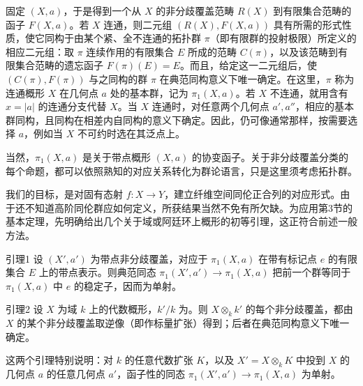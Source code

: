 固定 $(X,a)$，于是得到一个从 $X$ 的非分歧覆盖范畴 $R(X)$ 到有限集合范畴的函子 $F(X,a)$。若 $X$ 连通，则二元组 $(R(X),F(X,a))$ 具有所需的形式性质，使它同构于由某个紧、全不连通的拓扑群 $\pi$（即有限群的投射极限）所定义的相应二元组：取 $\pi$ 连续作用的有限集合 $E$ 所成的范畴 $C(\pi)$，以及该范畴到有限集合范畴的遗忘函子 $F(\pi)(E)=E$。而且，给定这一二元组后，使 $(C(\pi),F(\pi))$ 与之同构的群 $\pi$ 在典范同构意义下唯一确定。在这里，$\pi$ 称为连通概形 $X$ 在几何点 $a$ 处的基本群，记为 $\pi_1(X,a)$。若 $X$ 不连通，就用含有 $x=|a|$ 的连通分支代替 $X$。当 $X$ 连通时，对任意两个几何点 $a',a''$，相应的基本群同构，且同构在相差内自同构的意义下确定。因此，仍可像通常那样，按需要选择 $a$，例如当 $X$ 不可约时选在其泛点上。

当然，$\pi_1(X,a)$ 是关于带点概形 $(X,a)$ 的协变函子。关于非分歧覆盖分类的每个命题，都可以依照熟知的对应关系转化为群论语言，只是这里须考虑拓扑群。

我们的目标，是对固有态射 $f:X\to Y$，建立纤维空间同伦正合列的对应形式。由于还不知道高阶同伦群应如何定义，所获结果当然不免有所欠缺。为应用第3节的基本定理，先明确给出几个关于域或阿廷环上概形的初等引理，这正符合前述一般方法。
\begin{statement}{引理1}
设 $(X',a')$ 为带点非分歧覆盖，对应于 $\pi_1(X,a)$ 在带有标记点 $e$ 的有限集合 $E$ 上的带点表示。则典范同态 $\pi_1(X',a')\to\pi_1(X,a)$ 把前一个群等同于 $\pi_1(X,a)$ 中 $e$ 的稳定子，因而为单射。
\end{statement}
\begin{statement}{引理2}
设 $X$ 为域 $k$ 上的代数概形，$k'/k$ 为。则 $X\otimes_kk'$ 的每个非分歧覆盖，都由 $X$ 的某个非分歧覆盖取逆像（即作标量扩张）得到；后者在典范同构意义下唯一确定。
\end{statement}
这两个引理特别说明：对 $k$ 的任意代数扩张 $K$，以及 $X'=X\otimes_kK$ 中投到 $X$ 的几何点 $a$ 的任意几何点 $a'$，函子性的同态 $\pi_1(X',a')\to\pi_1(X,a)$ 为单射。

